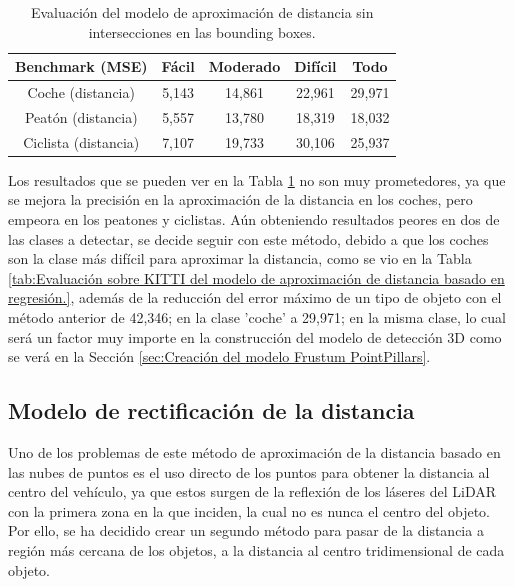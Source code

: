 \begin{table}[H]
\centering
\begin{tabular}{|c|c|c|c|c|}
\hline
\textbf{Benchmark (MSE)} & \textbf{Fácil} & \textbf{Moderado} & \textbf{Difícil} & \textbf{Todo}\\ \hline \hline
Coche (distancia)        & 5,143          & 14,861             & 22,961       &29,971     \\ \hline
Peatón (distancia)       & 5,557          & 13,780             & 18,319       &18,032     \\ \hline
Ciclista (distancia)     & 7,107          & 19,733             & 30,106       &25,937  \\ \hline
\end{tabular}
\caption{Evaluación del modelo de aproximación de distancia sin intersecciones en las bounding boxes.}
\label{fig:Evaluación del modelo de aproximación de distancia sin intersecciones en las bounding boxes.}
\end{table}

Los resultados que se pueden ver en la Tabla \ref{fig:Evaluación del modelo de aproximación de distancia sin intersecciones en las bounding boxes.} no son muy prometedores, ya que se mejora la precisión en la aproximación de la distancia en los coches, pero empeora en los peatones y ciclistas. Aún obteniendo resultados peores en dos de las clases a detectar, se decide seguir con este método, debido a que los coches son la clase más difícil para aproximar la distancia, como se vio en la Tabla \ref{tab:Evaluación sobre KITTI del modelo de aproximación de distancia basado en regresión.}, además de la reducción del error máximo de un tipo de objeto con el método anterior de 42,346; en la clase 'coche' a 29,971; en la misma clase, lo cual será un factor muy importe en la construcción del modelo de detección 3D como se verá en la Sección \ref{sec:Creación del modelo Frustum PointPillars}.

\subsection{Modelo de rectificación de la distancia}
\label{sec:Modelo de rectificación de la distancia}

Uno de los problemas de este método de aproximación de la distancia basado en las nubes de puntos es el uso directo de los puntos para obtener la distancia al centro del vehículo, ya que estos surgen de la reflexión de los láseres del \ac{LiDAR} con la primera zona en la que inciden, la cual no es nunca el centro del objeto. Por ello, se ha decidido crear un segundo método para pasar de la distancia a región más cercana de los objetos, a la distancia al centro tridimensional de cada objeto.

